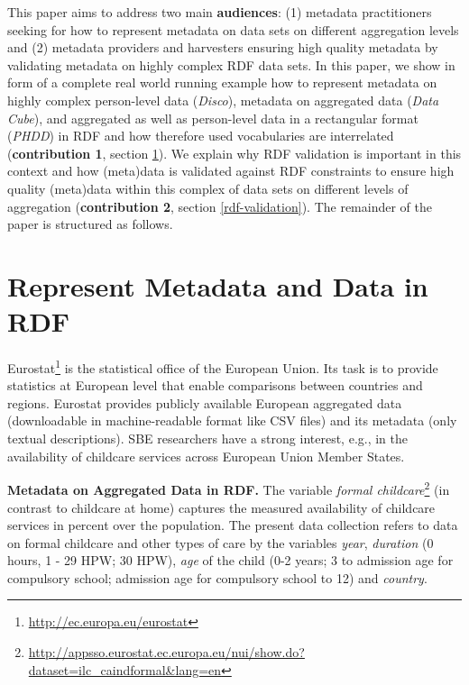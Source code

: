 \documentclass{llncs}
\begin{document}
This paper aims to address two main \textbf{audiences}: 
(1) metadata practitioners seeking for how to represent metadata on data sets on different aggregation levels and
(2) metadata providers and harvesters ensuring high quality metadata by validating metadata on highly complex RDF data sets.
In this paper, we show in form of a complete real world running example how to represent metadata on highly complex person-level data (\emph{Disco}), metadata on aggregated data (\emph{Data Cube}), and aggregated as well as person-level data in a rectangular format (\emph{PHDD}) in RDF and how therefore used vocabularies are interrelated (\textbf{contribution 1}, section \ref{rdf-representation}).
We explain why RDF validation is important in this context and how (meta)data is validated against RDF constraints to ensure high quality (meta)data within this complex of data sets on different levels of aggregation (\textbf{contribution 2}, section \ref{rdf-validation}). 
The remainder of the paper is structured as follows.

\section{Represent Metadata and Data in RDF}
\label{rdf-representation}

Eurostat\footnote{\url{http://ec.europa.eu/eurostat}} is the statistical office of the European Union. Its task is to provide statistics at European level that enable comparisons between countries and regions.
Eurostat provides publicly available European aggregated data (downloadable in machine-readable format like CSV files) and its metadata (only textual descriptions).
SBE researchers have a strong interest, e.g., in the availability of childcare services across European Union Member States.

\textbf{Metadata on Aggregated Data in RDF.}
The variable \emph{formal childcare}\footnote{\url{http://appsso.eurostat.ec.europa.eu/nui/show.do?dataset=ilc_caindformal&lang=en}} (in contrast to childcare at home)
captures the measured availability of childcare services in percent over the population.
The present data collection refers to data on formal childcare and other types of care by the variables \emph{year}, \emph{duration} (0 hours, 1 - 29 HPW; 30 HPW), \emph{age} of the child (0-2 years; 3 to admission age for compulsory school; admission age for compulsory school to 12) and \emph{country}.
\end{document}
